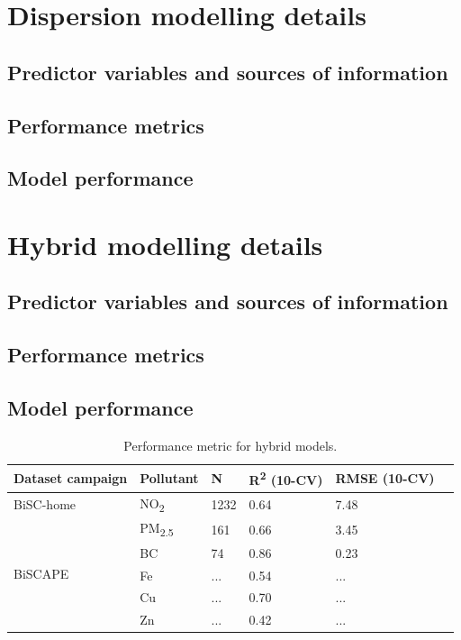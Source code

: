 \documentclass{article}
\begin{document}
\newpage


\section{Dispersion modelling details}

\subsection{Predictor variables and sources of information}

\subsection{Performance metrics}

\subsection{Model performance}


\newpage

\section{Hybrid modelling details}

\subsection{Predictor variables and sources of information}


\subsection{Performance metrics}


\subsection{Model performance}

\begin{table}[ht]
\centering
\caption{Performance metric for hybrid models.}
\begin{tabular}{llllll}
\toprule
\textbf{Dataset campaign} & \textbf{Pollutant} & \textbf{N} & \textbf{R\textsuperscript{2} (10-CV)} & \textbf{RMSE (10-CV)} \\
\midrule
BiSC-home & NO\textsubscript{2} & 1232 & 0.64 & 7.48 \\
\multirow{5}{*}{BiSCAPE} & PM\textsubscript{2.5} & 161 & 0.66 & 3.45 \\
& BC & 74 & 0.86 &  0.23 \\
& Fe & ... & 0.54 & ... \\
& Cu & ... & 0.70 & ... \\
& Zn & ... & 0.42 & ... \\
\bottomrule
\end{tabular}
\label{tablesX}
\end{table}
\end{document}
